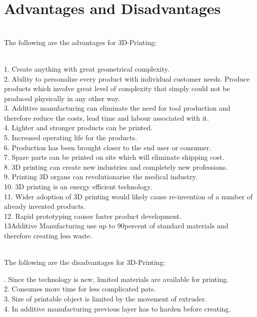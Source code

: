 \documentclass[12pt,a4paper]{report}
\begin{document}
	\chapter{Advantages and Disadvantages}
	
	\noindent
	\\The following are the advantages for 3D-Printing:\par
	\indent
	\\1. Create anything with great geometrical complexity.\\
	2. Ability to personalize every product with individual customer needs.
	Produce products which involve great level of complexity that simply could not be
	produced physically in any other way.\\
	3. Additive manufacturing can eliminate the need for tool production and therefore
	reduce the costs, lead time and labour associated with it.\\
	4. Lighter and stronger products can be printed.\\
	5. Increased operating life for the products.\\
	6. Production has been brought closer to the end user or consumer.\\
	7. Spare parts can be printed on site which will eliminate shipping cost.\\
	8. 3D printing can create new industries and completely new professions.\\
	9. Printing 3D organs can revolutionarise the medical industry.\\
	10. 3D printing is an energy efficient technology.\\
	11. Wider adoption of 3D printing would likely cause re-invention of a number of already
	invented products.\\
	12. Rapid prototyping causes faster product development.\\
	13Additive Manufacturing use up to 90percent of standard materials and therefore creating
	less waste.\\
	\par
	
	\noindent
	\\The following are the disadvantages for 3D-Printing:\par
	. Since the technology is new, limited materials are available for printing.\\
	2. Consumes more time for less complicated pats.\\
	3. Size of printable object is limited by the movement of extruder.\\
	4. In additive manufacturing previous layer has to harden before creating.
	
\end{document}
